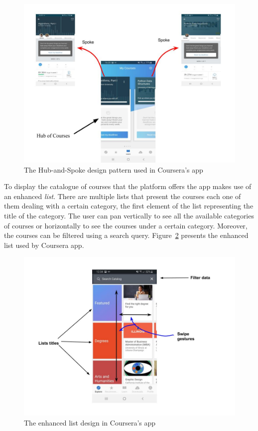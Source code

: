 \documentclass[version=last,fontsize=13pt]{scrartcl}
\begin{document}
		\begin{figure}[H]

			\centering	
			\includegraphics[scale = 0.5]{./imgs/HubSpokeCoursera.jpg}
			\caption{The Hub-and-Spoke design pattern used in Coursera's app}
			\label{hS}

		\end{figure}

	To display the catalogue of courses that the platform offers  the app makes use of an enhanced \textit{list}.  There are multiple lists that present the courses each one of them dealing with a certain category, the first element of the list representing the title of the category. The user can pan vertically to see all the available categories of courses or horizontally to see the courses under a certain category. Moreover, the courses can be filtered using  a search query. Figure~\ref{eL} presents the enhanced list used by Coursera app.

		\begin{figure}[H]

			\centering	
			\includegraphics[scale = 0.5]{./imgs/Catalogue.jpg}
			\caption{The enhanced list design in Coursera's app}
			\label{eL}

		\end{figure}
\end{document}
